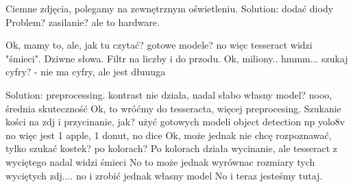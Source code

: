 Ciemne zdjęcia, polegamy na zewnętrznym oświetleniu.
Solution: dodać diody
Problem? zasilanie? ale to hardware.

Ok, mamy to, ale, jak tu czytać? gotowe modele?
no więc tesseract widzi "śmieci". Dziwne słowa.
Filtr na liczby i do przodu.
Ok, miliony.. hmmm...
szukaj cyfry? - nie ma cyfry, ale jest dłuuuga

Solution: preprocessing.
kontrast
nie działa, nadal słabo
własny model?
nooo, średnia skuteczność
Ok, to wróćmy do tesseracta, więcej preprocesing.
Szukanie kości na zdj i przycinanie, jak?
użyć gotowych modeli object detection np yolo8v
no więc jest 1 apple, 1 donut, no dice
Ok, może jednak nie chcę rozpoznawać, tylko szukać kostek?
po kolorach?
Po kolorach działa wycinanie, ale tesseract z wyciętego nadal widzi śmieci
No to może jednak wyrównac rozmiary tych wyciętych zdj.... no i zrobić jednak własny model
No i teraz jesteśmy tutaj.



